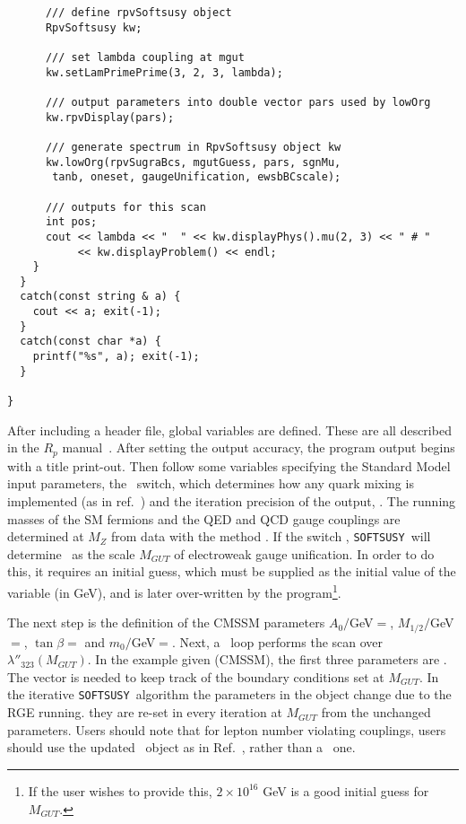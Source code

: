 \documentclass[final,3p,times,pdflatex]{elsarticle}
\def\SOFTSUSY{{\tt SOFTSUSY}}
\begin{document}
\begin{verbatim}
      /// define rpvSoftsusy object
      RpvSoftsusy kw;
      
      /// set lambda coupling at mgut
      kw.setLamPrimePrime(3, 2, 3, lambda); 
      
      /// output parameters into double vector pars used by lowOrg
      kw.rpvDisplay(pars);
      
      /// generate spectrum in RpvSoftsusy object kw
      kw.lowOrg(rpvSugraBcs, mgutGuess, pars, sgnMu,
       tanb, oneset, gaugeUnification, ewsbBCscale);
      
      /// outputs for this scan
      int pos;
      cout << lambda << "  " << kw.displayPhys().mu(2, 3) << " # " 
           << kw.displayProblem() << endl;
    }
  }
  catch(const string & a) {
    cout << a; exit(-1);
  }
  catch(const char *a) {
    printf("%s", a); exit(-1);
  }
  
}
\end{verbatim}
\normalsize
After including a header file, global variables are defined. These are all
described in the $R_p$ manual~\cite{Allanach:2001kg}.
After setting the output accuracy, 
the program output begins with a title print-out. Then follow
some variables specifying the Standard Model input parameters, the
~switch, which determines how any quark mixing is implemented
(as in ref.~\cite{Allanach:2001kg}) and
the iteration precision of the output, .
The running masses of the SM fermions and the QED and QCD gauge couplings are
determined at $M_Z$ from data with the method .
If the switch , \SOFTSUSY~will
determine ~as the scale $M_{GUT}$ of electroweak gauge
unification. In order to do 
this, it requires an initial guess, which must be 
supplied as the initial value of the variable  (in GeV), 
and is later over-written by the program\footnote{If the user wishes to provide
  this, $2 \times 10^{16}$ GeV is a good initial
guess for $M_{GUT}$.}.

The next step is the definition of the CMSSM parameters $A_0/$GeV$=$,
$M_{1/2}/$GeV$=$, $\tan \beta=$ and
$m_0/$GeV$=$. Next, a ~loop performs the scan over
$\lambda''_{323}(M_{GUT})$. 
In the example given (CMSSM), the first three parameters are
. The  vector is
needed to keep track 
of the boundary conditions set at $M_{GUT}$.
In the iterative \SOFTSUSY~algorithm
the parameters in the  
object change due to
the RGE running\@.
they are re-set in
every iteration at $M_{GUT}$ from the unchanged ~
parameters. Users should note that for lepton number violating couplings,
users should use the updated ~object as in
Ref.~\cite{rpvneut}, rather than a 
~one.
\end{document}

